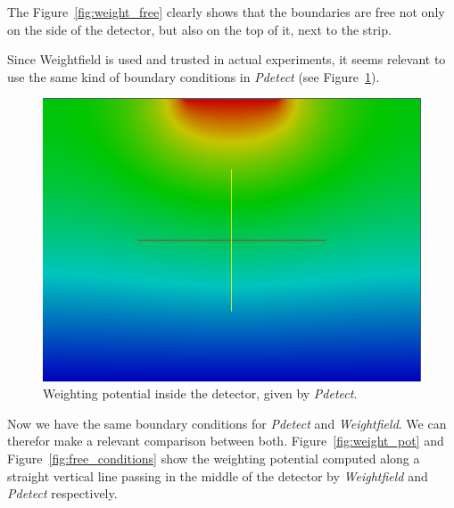 \documentclass[11pt]{article}
\begin{document}
		The Figure~\ref{fig:weight_free} clearly shows that the boundaries are free not only on the side of the detector,
		but also on the top of it, next to the strip.

		Since Weightfield is used and trusted in actual experiments, it seems relevant to use the same kind
		of boundary conditions in \textit{Pdetect} (see Figure~\ref{fig:pdetect_free}).

		\begin{figure}[H]
			\center
			\includegraphics[scale=0.45]{images/boundary_conditions/detector/w_free_conditions.png}
			\caption{Weighting potential inside the detector, given by \textit{Pdetect}.}
			\label{fig:pdetect_free}
		\end{figure}

		Now we have the same boundary conditions for \textit{Pdetect} and \textit{Weightfield}. We can
		therefor make a relevant comparison between both. Figure~\ref{fig:weight_pot} and Figure~\ref{fig:free_conditions}
		show the weighting potential computed along a straight vertical line passing in the middle of the detector
		by \textit{Weightfield} and \textit{Pdetect} respectively.
\end{document}
